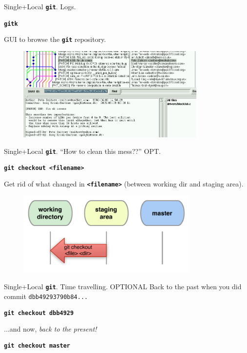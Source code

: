 \documentclass{beamer}
\newcommand{\git}{\texttt{\textbf{git}}\xspace}
\begin{document}
\begin{frame}{Single+Local \git. Logs.}
  \begin{center}
    \texttt{\textbf{gitk}}
  \end{center}
  GUI to browse the \git repository.
  \begin{figure}
    \centering
    \includegraphics[width=9.4cm]{figs/gitk_cropped}
  \end{figure}
\end{frame}


\begin{frame}{Single+Local \git. ``How to clean this mess??'' \alert{OPT.}}
  \begin{center}
    \texttt{\textbf{git checkout <filename>}}
  \end{center}
  Get rid of what changed in \texttt{\textbf{<filename>}} (between
  working dir and staging area).
  \begin{figure}
    \centering
    \includegraphics[width=9cm]{figs/local-checkout-file}
  \end{figure}
\end{frame}


\begin{frame}{Single+Local \git. Time travelling. \alert{OPTIONAL}}
  Back to the past when you did commit \texttt{\alert{dbb49293790b84...}}
  \begin{center}
    \texttt{\textbf{git checkout \alert{dbb4929}}}
  \end{center}
  ...and now, \emph{back to the present!}
  \begin{center}
    \texttt{\textbf{git checkout \alert{master}}}
  \end{center}
\end{frame}
\end{document}
